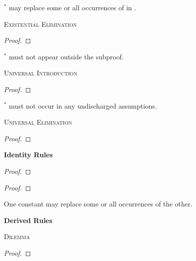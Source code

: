 $^\ast$  may replace some or all occurrences of  in .



\textsc{Existential Elimination}

\begin{proof}
	\open	
	\close
	 
\end{proof}

$^\ast$  must not appear outside the subproof.

\textsc{Universal Introduction}

\begin{proof}
	 
\end{proof}

$^\ast$  must not occur in any undischarged assumptions.


\textsc{Universal Elimination}

\begin{proof}
	 
\end{proof}




{\LARGE \bf Identity Rules}

\begin{proof}
	 
\end{proof}

\begin{proof}
	 
	 
\end{proof}

One constant may replace some or all occurrences of the other.





\newpage

{\LARGE \bf Derived Rules}

\textsc{Dilemma}

\begin{proof}
	 
\end{proof}

